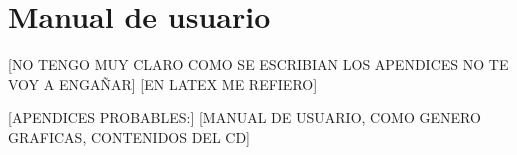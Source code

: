 \chapter{Manual de usuario}
[NO TENGO MUY CLARO COMO SE ESCRIBIAN LOS APENDICES NO TE VOY A ENGAÑAR]
[EN LATEX ME REFIERO]

[APENDICES PROBABLES:]
[MANUAL DE USUARIO, COMO GENERO GRAFICAS, CONTENIDOS DEL CD]









 